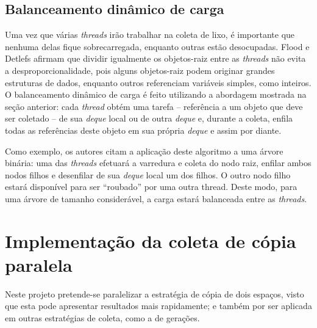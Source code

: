 \documentclass[ccc, pg2]{esinucpel}
\begin{document}


%



\subsection{Balanceamento dinâmico de carga} \label{sec:balanc}
Uma vez que várias \textit{threads} irão trabalhar na coleta de lixo, é importante que nenhuma delas fique sobrecarregada, enquanto outras estão desocupadas. Flood e Detlefs \cite{bib:flood:pargc} afirmam que dividir igualmente os objetos-raiz entre as \textit{threads} não evita a desproporcionalidade, pois alguns objetos-raiz podem originar grandes estruturas de dados, enquanto outros referenciam variáveis simples, como inteiros.
O balanceamento dinâmico de carga é feito utilizando a abordagem mostrada na seção anterior: cada \textit{thread} obtém uma tarefa -- referência a um objeto que deve ser coletado -- de sua {\it deque} local ou de outra {\it deque} e, durante a coleta, enfila todas as referências deste objeto em sua própria {\it deque} e assim por diante.

Como exemplo, os autores citam a aplicação deste algoritmo a uma árvore binária: uma das \textit{threads} efetuará a varredura e coleta do nodo raiz, enfilar ambos nodos filhos e desenfilar de sua {\it deque} local um dos filhos. O outro nodo filho estará disponível para ser ``roubado'' por uma outra thread. Deste modo, para uma árvore de tamanho considerável, a carga estará balanceada entre as {\it threads}.


\section{Implementação da coleta de cópia paralela} \label{sec:parcopy}
Neste projeto pretende-se paralelizar a estratégia de cópia de dois espaços, visto que esta pode apresentar resultados mais rapidamente; e também por ser aplicada em outras estratégias de coleta, como a de gerações.%
\end{document}
